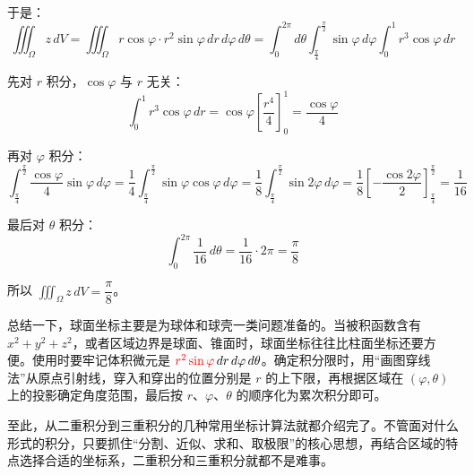 \begin{myexample}
\begin{center}
\end{center}

于是：
\[
\iiint_{\Omega} z\,dV
= \iiint_{\Omega} r\cos\varphi\cdot r^2\sin\varphi\,dr\,d\varphi\,d\theta
= \int_{0}^{2\pi} d\theta \int_{\frac{\pi}{4}}^{\frac{\pi}{2}} \sin\varphi\,d\varphi \int_{0}^{1} r^3\cos\varphi\,dr
\]

先对 \(r\) 积分，\(\cos\varphi\) 与 \(r\) 无关：
\[
\int_{0}^{1} r^3\cos\varphi\,dr = \cos\varphi\left[ \frac{r^4}{4} \right]_{0}^{1} = \frac{\cos\varphi}{4}
\]

再对 \(\varphi\) 积分：
\[
\int_{\frac{\pi}{4}}^{\frac{\pi}{2}} \frac{\cos\varphi}{4} \sin\varphi\,d\varphi
= \frac{1}{4} \int_{\frac{\pi}{4}}^{\frac{\pi}{2}} \sin\varphi\cos\varphi\,d\varphi
= \frac{1}{8} \int_{\frac{\pi}{4}}^{\frac{\pi}{2}} \sin 2\varphi\,d\varphi
= \frac{1}{8} \left[ -\frac{\cos 2\varphi}{2} \right]_{\frac{\pi}{4}}^{\frac{\pi}{2}}
= \frac{1}{16}
\]

最后对 \(\theta\) 积分：
\[
\int_{0}^{2\pi} \frac{1}{16}\,d\theta = \frac{1}{16} \cdot 2\pi = \frac{\pi}{8}
\]

所以 \(\iiint_{\Omega} z\,dV = \dfrac{\pi}{8}\)。
\end{myexample}

总结一下，球面坐标主要是为球体和球壳一类问题准备的。当被积函数含有 \(x^2+y^2+z^2\)，或者区域边界是球面、锥面时，球面坐标往往比柱面坐标还要方便。使用时要牢记体积微元是 \(\textcolor{red}{r^2\sin\varphi}\,dr\,d\varphi\,d\theta\)。确定积分限时，用“画图穿线法”从原点引射线，穿入和穿出的位置分别是 \(r\) 的上下限，再根据区域在 \((\varphi,\theta)\) 上的投影确定角度范围，最后按 \(r\)、\(\varphi\)、\(\theta\) 的顺序化为累次积分即可。

至此，从二重积分到三重积分的几种常用坐标计算法就都介绍完了。不管面对什么形式的积分，只要抓住“分割、近似、求和、取极限”的核心思想，再结合区域的特点选择合适的坐标系，二重积分和三重积分就都不是难事。